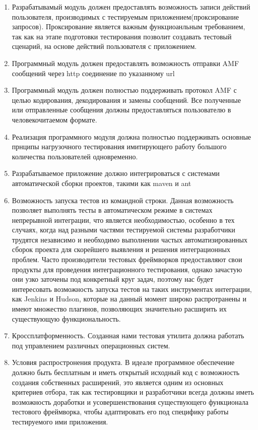 \begin{enumerate}
\item Разрабатывамый модуль должен предоставлять возможность записи действий пользователя, 
производимых с тестируемым приложением(проксирование запросов). Проксирование является важным функциоанльным
требованием, так как на этапе подготовки тестирования позволит создавать тестовый сценарий, на основе действий 
пользователя с приложением.
\item Программный модуль должен предоставлять возможность отправки AMF сообщений через http соединение по
указанному url
\item Программный модуль должен полностью поддерживать протокол AMF с целью кодирования, декодирования и замены
сообщений. Все полученные или отправленные сообщения должны предоставляться пользователю в человекочитаемом
формате.
\item Реализация программного модуля должна полностью поддерживать основные прнципы нагрузочного тестирования
имитирующего работу большого количества пользователей одновременно.
\item Разрабатываемое приложение должно интегрироваться с системами автоматической сборки проектов, такими как maven и ant
\item Возможность запуска тестов из командной строки. Данная возможность позволяет
выполнять тесты в автоматическом режиме в системах непрерывной интеграции, что
является необходимостью, особенно в тех случаях, когда над разными частями
тестируемой системы разработчики трудятся независимо и необходимо
выполнении частых автоматизированных сборок проекта для скорейшего
выявления и решения интеграционных проблем. Часто производители тестовых
фреймворков предоставляют свои продукты для проведения интеграционного тестирования, однако
зачастую они узко заточены под конкретный круг задач, поэтому нас будет интересовать
возможность запуска тестов на таких инструментах интеграции, как Jenkins и
Hudson, которые на данный момент широко распротранены и имеют множество плагинов, позволяющих
значительно расширить их существующую функциональность.
\item Кроссплатформенность. Созданная нами тестовая утилита должна работать
под управлением различных операционных систем.
\item Условия распростронения продукта. В идеале программное обеспечение должно быть
бесплатным и иметь открытый исходный код с возможность создания собственных расширений,
это является одним из основных критериев отбора, так как тестировщики и разработчики
всегда должны иметь возможность доработки и усовершенствования существующего функционала
тестового фреймворка, чтобы адаптировать его под специфику работы тестируемого ими приложения.
\end{enumerate}

